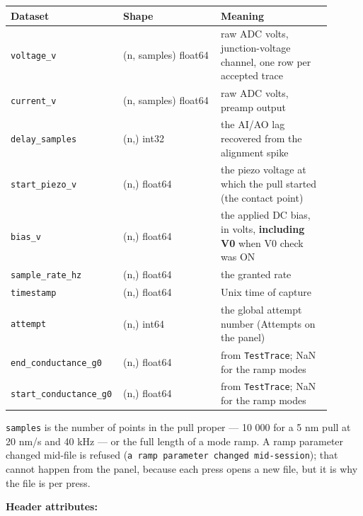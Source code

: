 \small\setlength{\LTleft}{0pt}\setlength{\LTright}{\fill}
\begin{longtable}{@{}>{\raggedright\arraybackslash}p{0.26\linewidth}>{\raggedright\arraybackslash}p{0.30\linewidth}>{\raggedright\arraybackslash}p{0.34\linewidth}@{}}
\toprule
\textbf{Dataset} & \textbf{Shape} & \textbf{Meaning} \\
\midrule\endhead
\texttt{voltage\_\discretionary{}{}{}v} & (n, samples) float64 & raw ADC volts, junction-voltage channel, one row per accepted trace \\
\texttt{current\_\discretionary{}{}{}v} & (n, samples) float64 & raw ADC volts, preamp output \\
\texttt{delay\_\discretionary{}{}{}samples} & (n,) int32 & the AI/AO lag recovered from the alignment spike \\
\texttt{start\_\discretionary{}{}{}piezo\_\discretionary{}{}{}v} & (n,) float64 & the piezo voltage at which the pull started (the contact point) \\
\texttt{bias\_\discretionary{}{}{}v} & (n,) float64 & the applied DC bias, in volts, \textbf{including V0} when V0 check was ON \\
\texttt{sample\_\discretionary{}{}{}rate\_\discretionary{}{}{}hz} & (n,) float64 & the granted rate \\
\texttt{timestamp} & (n,) float64 & Unix time of capture \\
\texttt{attempt} & (n,) int64 & the global attempt number (Attempts on the panel) \\
\texttt{end\_\discretionary{}{}{}conductance\_\discretionary{}{}{}g0} & (n,) float64 & from \texttt{Test\discretionary{}{}{}Trace}; NaN for the ramp modes \\
\texttt{start\_\discretionary{}{}{}conductance\_\discretionary{}{}{}g0} & (n,) float64 & from \texttt{Test\discretionary{}{}{}Trace}; NaN for the ramp modes \\
\bottomrule
\end{longtable}
\normalsize

\texttt{samples} is the number of points in the pull proper --- 10 000 for a 5 nm pull at 20 nm/s and 40 kHz --- or the full length of a mode ramp. A ramp parameter changed mid-file is refused (\texttt{a ramp parameter changed mid-session}); that cannot happen from the panel, because each press opens a new file, but it is why the file is per press.

\textbf{Header attributes:}

